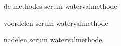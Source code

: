 \documentclass{beamer}
\begin{document}
	
\begin{frame}{de methodes}
	scrum
	watervalmethode
\end{frame}

\begin{frame}{voordelen}
scrum
watervalmethode
\end{frame}

\begin{frame}{nadelen}
scrum
watervalmethode
\end{frame}
\end{document}
